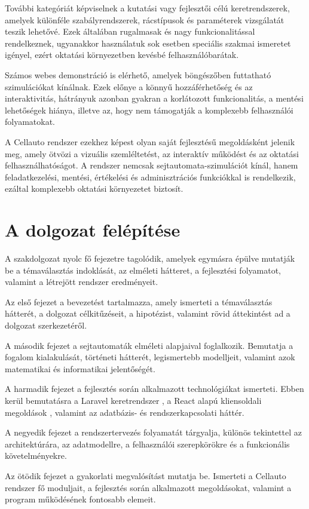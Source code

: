 \documentclass{thesis-ekf}
\begin{document}
További kategóriát képviselnek a kutatási vagy fejlesztői célú keretrendszerek, amelyek különféle szabályrendszerek, rácstípusok és paraméterek vizsgálatát teszik lehetővé. Ezek általában rugalmasak és nagy funkcionalitással rendelkeznek, ugyanakkor használatuk sok esetben speciális szakmai ismeretet igényel, ezért oktatási környezetben kevésbé felhasználóbarátak.

Számos webes demonstráció is elérhető, amelyek böngészőben futtatható szimulációkat kínálnak. Ezek előnye a könnyű hozzáférhetőség és az interaktivitás, hátrányuk azonban gyakran a korlátozott funkcionalitás, a mentési lehetőségek hiánya, illetve az, hogy nem támogatják a komplexebb felhasználói folyamatokat.

A Cellauto rendszer ezekhez képest olyan saját fejlesztésű megoldásként jelenik meg, amely ötvözi a vizuális szemléltetést, az interaktív működést és az oktatási felhasználhatóságot. A rendszer nemcsak sejtautomata-szimulációt kínál, hanem feladatkezelési, mentési, értékelési és adminisztrációs funkciókkal is rendelkezik, ezáltal komplexebb oktatási környezetet biztosít.

\section{A dolgozat felépítése}
A szakdolgozat nyolc fő fejezetre tagolódik, amelyek egymásra épülve mutatják be a témaválasztás indoklását, az elméleti hátteret, a fejlesztési folyamatot, valamint a létrejött rendszer eredményeit.

Az első fejezet a bevezetést tartalmazza, amely ismerteti a témaválasztás hátterét, a dolgozat célkitűzéseit, a hipotézist, valamint rövid áttekintést ad a dolgozat szerkezetéről.

A második fejezet a sejtautomaták elméleti alapjaival foglalkozik. Bemutatja a fogalom kialakulását, történeti hátterét, legismertebb modelljeit, valamint azok matematikai és informatikai jelentőségét.

A harmadik fejezet a fejlesztés során alkalmazott technológiákat ismerteti. Ebben kerül bemutatásra a Laravel keretrendszer \cite{laravel}, a React alapú kliensoldali megoldások \cite{react}, valamint az adatbázis- és rendszerkapcsolati háttér.

A negyedik fejezet a rendszertervezés folyamatát tárgyalja, különös tekintettel az architektúrára, az adatmodellre, a felhasználói szerepkörökre és a funkcionális követelményekre.

Az ötödik fejezet a gyakorlati megvalósítást mutatja be. Ismerteti a Cellauto rendszer fő moduljait, a fejlesztés során alkalmazott megoldásokat, valamint a program működésének fontosabb elemeit.
\end{document}

